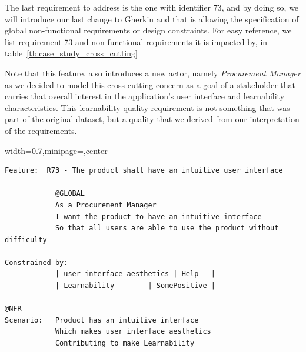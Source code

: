 \documentclass[dissertation,final]{softeng}
\newcommand{\nfrs}{non-functional requirements\xspace}
\newenvironment{featurecode}[1]
{ \lrbox\featurebox \begin{adjustbox}{width=#1\textwidth,minipage=\textwidth,center} }
{ \end{adjustbox}\endlrbox}
\newenvironment{featurelist}[2]
{
\newcommand{\setcaption}{\caption{#1}}
\newcommand{\setlabel}{\label{#2}}
}
{\begin{listing}[h!]\centering\usebox\featurebox\setcaption\setlabel\end{listing}}
\begin{document}
The last requirement to address is the one with identifier 73, and by doing so, we will introduce our last change to Gherkin and that is allowing the specification of global \nfrs or design constraints. For easy reference, we list requirement 73 and \nfrs it is impacted by, in table~\ref{tb:case_study_cross_cutting}

\begin{table}[h!]
\caption[Cross-cutting \nfrs]{Cross-cutting \nfrs}
\label{tb:case_study_cross_cutting}
\setlength{\extrarowheight}{1.8pt}
\centering
{}
\end{table}

Note that this feature, also introduces a new actor, namely \emph{Procurement Manager} as we decided to model this cross-cutting concern as a goal of a stakeholder that carries that overall interest in the application's user interface and learnability characteristics. This learnability quality requirement is not something that was part of the original dataset, but a quality that we derived from our interpretation of the requirements.

\begin{featurelist}{R73 -- The product shall have an intuitive user interface}{lst:feature_r73}
\begin{featurecode}{0.7}
\begin{verbatim}
Feature:  R73 - The product shall have an intuitive user interface
			
            @GLOBAL
            As a Procurement Manager
            I want the product to have an intuitive interface
            So that all users are able to use the product without difficulty
	
Constrained by:
            | user interface aesthetics | Help	 |
            | Learnability	      | SomePositive |
		
@NFR		
Scenario:   Product has an intuitive interface
            Which makes user interface aesthetics
            Contributing to make Learnability
\end{verbatim}
\end{featurecode}
\end{featurelist}
\end{document}
